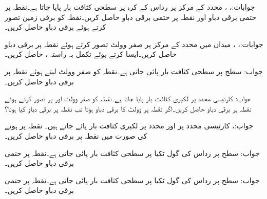 جوابات:، ، 
محدد کے مرکز پر  رداس کے کرہ پر سطحی کثافت بار  پایا جاتا ہے۔نقطہ  پر حتمی برقی دباو  اور  نقطہ   پر حتمی برقی دباو  حاصل کریں۔نقطہ  کو برقی زمین تصور کرتے ہوئے برقی دباو  حاصل کریں۔ 

جوابات:، ، 
میدان  میں محدد کے مرکز پر صفر وولٹ تصور کرتے ہوئے نقطہ  پر برقی دباو حاصل کریں۔ایسا کرتے ہوئے تکمل بہ راستہ ،  حاصل کریں۔

جواب:
سطح  پر سطحی کثافت بار  پائی جاتی ہے۔نقطہ  کو صفر وولٹ لیتے ہوئے  نقطہ  پر برقی دباو  حاصل کریں۔

جواب:
کارتیسی  محدد پر لکیری کثافت بار  پایا جاتا ہے۔نقطہ  کو صفر وولٹ اور پر تصور کرتے ہوئے نقطہ  پر برقی دباو حاصل کریں۔اگر نقطہ  پر  وولٹ کا برقی دباو ہوتا تب نقطہ  پر برقی دباو کیا ہوتا؟

جواب:، 
کارتیسی  محدد پر  اور  محدد پر  لکیری کثافت بار پائے جاتے ہیں۔ نقطہ  پر  ہونے کی صورت میں نقطہ  پر برقی دباو حاصل کریں۔

جواب:
 سطح  پر رداس  کی گول ٹکیا  پر سطحی کثافت بار  پائی جاتی ہے۔نقطہ  پر  حتمی برقی دباو حاصل کریں۔

جواب:
 سطح  پر رداس  کی گول ٹکیا  پر سطحی کثافت بار  پائی جاتی ہے۔نقطہ  پر  حتمی برقی دباو حاصل کریں۔

